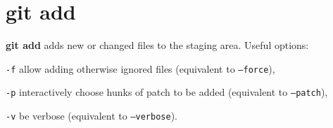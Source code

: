 %

\section{git add}
\textbf{git add} adds new or changed files to the staging area.
Useful options:
\begin{compactenum}
\item [\texttt{-f}] allow adding otherwise ignored files (equivalent to \texttt{--force}),
\item [\texttt{-p}] interactively choose hunks of patch to be added (equivalent to \texttt{--patch}),
\item [\texttt{-v}] be verbose (equivalent to \texttt{--verbose}).
\end{compactenum}

%